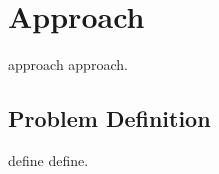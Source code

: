 \chapter{Approach}\label{chap:approach}
approach approach.

\section{Problem Definition}
define define.

